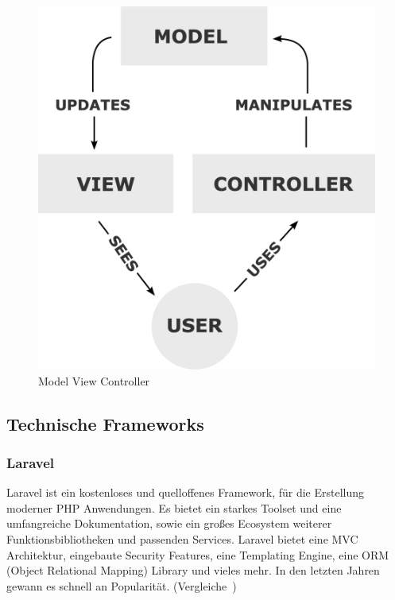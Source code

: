 \begin{figure}[h!]
    \centering
    \caption{Model View Controller}
    \label{fig:mvc}
    \includegraphics[scale=0.15]{assets/wikipedia_mvc_process}
\end{figure}

\newpage

\subsection{Technische Frameworks}

\subsubsection{Laravel}
Laravel ist ein kostenloses und quelloffenes Framework, für die Erstellung moderner PHP Anwendungen.
Es bietet ein starkes Toolset und eine umfangreiche Dokumentation, sowie ein großes Ecosystem weiterer Funktionsbibliotheken und passenden Services.
Laravel bietet eine MVC Architektur, eingebaute Security Features, eine Templating Engine, eine ORM (Object Relational Mapping) Library und vieles mehr.
In den letzten Jahren gewann es schnell an Popularität.
(Vergleiche~\cite{what-is-laravel})

